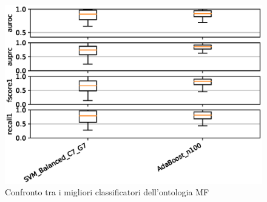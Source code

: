 \documentclass[12pt,a4paper,oneside,hidelinks]{report}
\begin{document}
\begin{figure}[hb]%
    \centering
    \includegraphics[scale = 0.80]{MF-level3.eps}%
    \caption{Confronto tra i migliori classificatori dell'ontologia MF}%
    \label{figure:liv31}%
\end{figure}

\vspace*{\fill}

\end{document}
